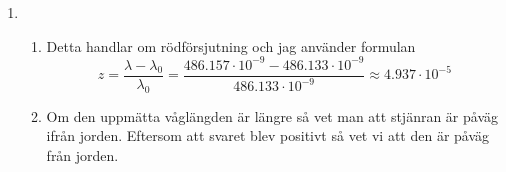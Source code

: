 \documentclass[a4paper,12pt]{article}
\begin{document}
\begin{enumerate}
\begin{enumerate}
      \end{enumerate}
      \item 
      \begin{enumerate}
            \item  
            Detta handlar om rödförsjutning och jag använder formulan
            $$z=\frac{\lambda-\lambda_0}{\lambda_0}=\frac{486.157\cdot 10^{-9}-486.133\cdot 10^{-9}}{486.133\cdot 10^{-9}}\approx 4.937\cdot 10^{-5}$$

            \item Om den uppmätta våglängden är längre så vet man att stjänran
            är påväg ifrån jorden. Eftersom att svaret blev positivt så vet vi att den är påväg från jorden.
      \end{enumerate}

\end{enumerate}
\end{document}
